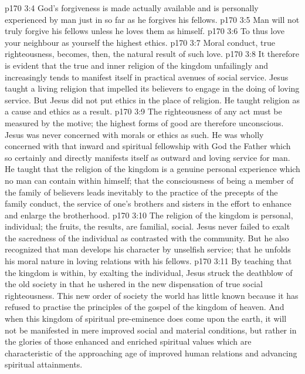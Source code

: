 \vs p170 3:4 \bibnobreakspace God’s forgiveness is made actually available and is personally experienced by man just in so far as he forgives his fellows.
\vs p170 3:5 \bibnobreakspace Man will not truly forgive his fellows unless he loves them as himself.
\vs p170 3:6 \bibnobreakspace To thus love your neighbour as yourself  the highest ethics.
\vs p170 3:7 \bibnobreakspace Moral conduct, true righteousness, becomes, then, the natural result of such love.
\vs p170 3:8 \pc It therefore is evident that the true and inner religion of the kingdom unfailingly and increasingly tends to manifest itself in practical avenues of social service. Jesus taught a living religion that impelled its believers to engage in the doing of loving service. But Jesus did not put ethics in the place of religion. He taught religion as a cause and ethics as a result.
\vs p170 3:9 The righteousness of any act must be measured by the motive; the highest forms of good are therefore unconscious. Jesus was never concerned with morals or ethics as such. He was wholly concerned with that inward and spiritual fellowship with God the Father which so certainly and directly manifests itself as outward and loving service for man. He taught that the religion of the kingdom is a genuine personal experience which no man can contain within himself; that the consciousness of being a member of the family of believers leads inevitably to the practice of the precepts of the family conduct, the service of one’s brothers and sisters in the effort to enhance and enlarge the brotherhood.
\vs p170 3:10 The religion of the kingdom is personal, individual; the fruits, the results, are familial, social. Jesus never failed to exalt the sacredness of the individual as contrasted with the community. But he also recognized that man develops his character by unselfish service; that he unfolds his moral nature in loving relations with his fellows.
\vs p170 3:11 By teaching that the kingdom is within, by exalting the individual, Jesus struck the deathblow of the old society in that he ushered in the new dispensation of true social righteousness. This new order of society the world has little known because it has refused to practise the principles of the gospel of the kingdom of heaven. And when this kingdom of spiritual pre\hyp{}eminence does come upon the earth, it will not be manifested in mere improved social and material conditions, but rather in the glories of those enhanced and enriched spiritual values which are characteristic of the approaching age of improved human relations and advancing spiritual attainments.
